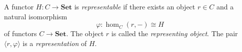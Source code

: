 A functor $H: C \to \mathbf{Set}$ is \emph{representable} if there exists an object $r \in C$ and a natural isomorphism
$$\varphi: \hom_C(r, -) \cong H$$
of functors $C \to \mathbf{Set}$. The object $r$ is called the \emph{representing object}. The pair $\langle r, \varphi \rangle$ is a \emph{representation} of $H$.
